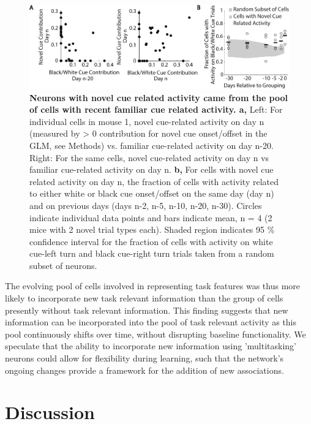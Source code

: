 \begin{figure}
\includegraphics[width=\textwidth]{figures/7_learning_same_pool.pdf}
\caption[Neurons with novel cue related activity came from the pool of cells with recent familiar cue related activity.]{\textbf{Neurons with novel cue related activity came from the pool of cells with recent familiar cue related activity. a,}
Left: For individual cells in mouse 1, novel cue-related activity on day n (measured by > 0 contribution for novel cue onset/offset in the GLM, see Methods) vs. familiar cue-related activity on day n-20. Right: For the same cells, novel cue-related activity on day n vs familiar cue-related activity on day n.
%
\textbf{b,} For cells with novel cue related activity on day n, the fraction of cells with activity related to either white or black cue onset/offset on the same day (day n) and on previous days (days n-2, n-5, n-10, n-20, n-30). Circles indicate individual data points and bars indicate mean, n = 4 (2 mice with 2 novel trial types each). Shaded region indicates 95 $\%$ confidence interval for the fraction of cells with activity on white cue-left turn and black cue-right turn trials taken from a random subset of neurons.
\label{fig:7_learning_same_pool}}
\end{figure}

The evolving pool of cells involved in representing task features was thus more likely to incorporate new task relevant information than the group of cells presently without task relevant information. This finding suggests that new information can be incorporated into the pool of task relevant activity as this pool continuously shifts over time, without disrupting baseline functionality. We speculate that the ability to incorporate new information using 'multitasking' neurons could allow for flexibility during learning, such that the network's ongoing changes provide a framework for the addition of new associations.

\section{Discussion}


